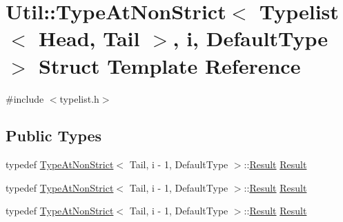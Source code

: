 \hypertarget{structUtil_1_1TL_1_1TypeAtNonStrict_3_01Typelist_3_01Head_00_01Tail_01_4_00_01i_00_01DefaultType_01_4}{}\section{Util\+:\+:Type\+At\+Non\+Strict$<$ Typelist$<$ Head, Tail $>$, i, Default\+Type $>$ Struct Template Reference}
\label{structUtil_1_1TL_1_1TypeAtNonStrict_3_01Typelist_3_01Head_00_01Tail_01_4_00_01i_00_01DefaultType_01_4}


{\ttfamily \#include $<$typelist.\+h$>$}

\subsection*{Public Types}
\begin{DoxyCompactItemize}
\item 
typedef \mbox{\hyperlink{structUtil_1_1TL_1_1TypeAtNonStrict}{Type\+At\+Non\+Strict}}$<$ Tail, i -\/ 1, Default\+Type $>$\+::\mbox{\hyperlink{structUtil_1_1TL_1_1TypeAtNonStrict_3_01Typelist_3_01Head_00_01Tail_01_4_00_01i_00_01DefaultType_01_4_a8373e5740e40b58eb026277b65fdd1de}{Result}} \mbox{\hyperlink{structUtil_1_1TL_1_1TypeAtNonStrict_3_01Typelist_3_01Head_00_01Tail_01_4_00_01i_00_01DefaultType_01_4_a8373e5740e40b58eb026277b65fdd1de}{Result}}
\item 
typedef \mbox{\hyperlink{structUtil_1_1TL_1_1TypeAtNonStrict}{Type\+At\+Non\+Strict}}$<$ Tail, i -\/ 1, Default\+Type $>$\+::\mbox{\hyperlink{structUtil_1_1TL_1_1TypeAtNonStrict_3_01Typelist_3_01Head_00_01Tail_01_4_00_01i_00_01DefaultType_01_4_a8373e5740e40b58eb026277b65fdd1de}{Result}} \mbox{\hyperlink{structUtil_1_1TL_1_1TypeAtNonStrict_3_01Typelist_3_01Head_00_01Tail_01_4_00_01i_00_01DefaultType_01_4_a8373e5740e40b58eb026277b65fdd1de}{Result}}
\item 
typedef \mbox{\hyperlink{structUtil_1_1TL_1_1TypeAtNonStrict}{Type\+At\+Non\+Strict}}$<$ Tail, i -\/ 1, Default\+Type $>$\+::\mbox{\hyperlink{structUtil_1_1TL_1_1TypeAtNonStrict_3_01Typelist_3_01Head_00_01Tail_01_4_00_01i_00_01DefaultType_01_4_a8373e5740e40b58eb026277b65fdd1de}{Result}} \mbox{\hyperlink{structUtil_1_1TL_1_1TypeAtNonStrict_3_01Typelist_3_01Head_00_01Tail_01_4_00_01i_00_01DefaultType_01_4_a8373e5740e40b58eb026277b65fdd1de}{Result}}
\end{DoxyCompactItemize}


